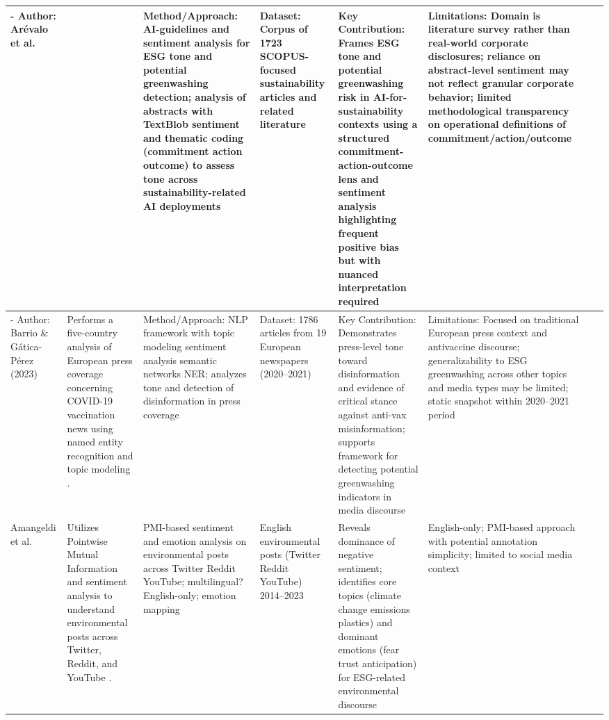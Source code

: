 \documentclass{article}
\begin{document}
\begin{landscape}
\begin{longtable}{p{1.8cm}
p{2.6cm}
p{3.4cm}
p{2.6cm}
p{3.5cm}
p{3.5cm}
p{0.8cm}}
- Author: Arévalo et al. & ~ & Method/Approach: AI-guidelines and sentiment analysis for ESG tone and potential greenwashing detection; analysis of abstracts with TextBlob sentiment and thematic coding (commitment action outcome) to assess tone across sustainability-related AI deployments & Dataset: Corpus of 1723 SCOPUS-focused sustainability articles and related literature & Key Contribution: Frames ESG tone and potential greenwashing risk in AI-for-sustainability contexts using a structured commitment-action-outcome lens and sentiment analysis highlighting frequent positive bias but with nuanced interpretation required & Limitations: Domain is literature survey rather than real-world corporate disclosures; reliance on abstract-level sentiment may not reflect granular corporate behavior; limited methodological transparency on operational definitions of commitment/action/outcome & ~ \\ \hline
- Author: Barrio \& Gática-Pérez (2023) & Performs a five-country analysis of European press coverage concerning COVID-19 vaccination news using named entity recognition and topic modeling  \parencite{david_alonso_del_barrio_725eba22}. & Method/Approach: NLP framework with topic modeling sentiment analysis semantic networks NER; analyzes tone and detection of disinformation in press coverage & Dataset: 1786 articles from 19 European newspapers (2020–2021) & Key Contribution: Demonstrates press-level tone toward disinformation and evidence of critical stance against anti-vax misinformation; supports framework for detecting potential greenwashing indicators in media discourse & Limitations: Focused on traditional European press context and antivaccine discourse; generalizability to ESG greenwashing across other topics and media types may be limited; static snapshot within 2020–2021 period & ~ \\ \hline
Amangeldi et al. & Utilizes Pointwise Mutual Information and sentiment analysis to understand environmental posts across Twitter, Reddit, and YouTube  \parencite{daniyar_amangeldi_dfc2f315}. & PMI-based sentiment and emotion analysis on environmental posts across Twitter Reddit YouTube; multilingual? English-only; emotion mapping & English environmental posts (Twitter Reddit YouTube) 2014–2023 & Reveals dominance of negative sentiment; identifies core topics (climate change emissions plastics) and dominant emotions (fear trust anticipation) for ESG-related environmental discourse & English-only; PMI-based approach with potential annotation simplicity; limited to social media context & ~ \\ \hline

\end{longtable}
\end{landscape}
\end{document}
